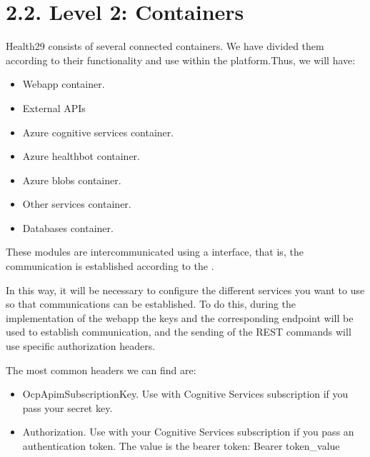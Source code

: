 \documentclass[letterpaper,10pt,english]{sphinxmanual}
\begin{document}
\chapter{2.2. Level 2: Containers}
\label{\detokenize{pages/SW/Containers:level-2-containers}}\label{\detokenize{pages/SW/Containers::doc}}
Health29 consists of several connected containers.
We have divided them according to their functionality and use within the platform.Thus, we will have:
\begin{itemize}
\item {} 
Webapp container.

\item {} 
External APIs

\item {} 
Azure cognitive services container.

\item {} 
Azure healthbot container.

\item {} 
Azure blobs container.

\item {} 
Other services container.

\item {} 
Databases container.

\end{itemize}



These modules are intercommunicated using a  interface, that is, the communication is established according to the .

In this way, it will be necessary to configure the different services you want to use so that communications can be established. To do this, during the implementation of the webapp the keys and the corresponding endpoint will be used to establish communication, and the sending of the REST commands will use specific authorization headers.

The most common headers we can find are:
\begin{itemize}
\item {} 
Ocp\sphinxhyphen{}Apim\sphinxhyphen{}Subscription\sphinxhyphen{}Key. Use with Cognitive Services subscription if you pass your secret key.

\item {} 
Authorization. Use with your Cognitive Services subscription if you pass an authentication token. The value is the bearer token: Bearer token\_value

\end{itemize}
\end{document}
